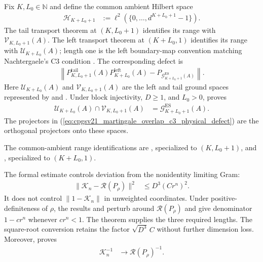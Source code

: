 \documentclass{article}
\providecommand{\Fin}[1]{\{0,\ldots,#1{-}1\}}
\begin{document}
Fix $K,L_0\in\mathbb N$ and define the common ambient Hilbert space
\begin{align}
    \mathcal H_{K+L_0+1}
     & :=
    \ell^2(\Fin{d^{K+L_0+1}}).
    \label{eq:cpgsv21_martingale_overlap_c3_common_ambient}
\end{align}
The tail transport theorem at $(K,L_0+1)$ identifies its range with
$\mathcal V_{K,L_0+1}(A)$. The left transport theorem at $(K+L_0,1)$
identifies its range with $\mathcal U_{K+L_0}(A)$; length one is the left
boundary-map convention matching Nachtergaele's C3 condition
\cite[Equation~(2.4)]{Nachtergaele1996Spectral}. The corresponding defect is
\begin{align}
    \left\lVert
    P^{\mathrm{tail}}_{K,L_0+1}(A)
    P^{\mathrm{left}}_{K+L_0}(A)
    -P_{\mathcal G_{K+L_0+1}^{\mathrm{ES}}(A)}
    \right\rVert.
    \label{eq:cpgsv21_martingale_overlap_c3_physical_defect}
\end{align}
Here $\mathcal U_{K+L_0}(A)$ and $\mathcal V_{K,L_0+1}(A)$ are the left and
tail ground spaces represented by
 and
. Under block injectivity,
$D\geq1$, and $L_0>0$,
 proves
\begin{align}
    \mathcal U_{K+L_0}(A)\cap\mathcal V_{K,L_0+1}(A)
     & =
    \mathcal G_{K+L_0+1}^{\mathrm{ES}}(A).
    \label{eq:cpgsv21_martingale_overlap_c3_ground_space_intersection}
\end{align}
The projectors in
(\ref{eq:cpgsv21_martingale_overlap_c3_physical_defect}) are the orthogonal
projectors onto these spaces.

The common-ambient range identifications are
,
specialized to $(K,L_0+1)$, and
,
specialized to $(K+L_0,1)$.

The formal estimate controls deviation from the nonidentity limiting Gram:
\begin{align}
    \lVert\mathcal K_n-\mathscr R(P_\rho)\rVert^2
     & \leq D^3(Cr^n)^2.
    \label{eq:cpgsv21_martingale_overlap_repeated_gram_control}
\end{align}
It does not control $\lVert1-\mathcal K_n\rVert$ in unweighted coordinates.
Under positive-definiteness of $\rho$, the results
 and
perturb around $\mathscr R(P_\rho)$ and give denominator $1-cr^n$ whenever
$cr^n<1$. The theorem
 supplies the three
required lengths. The square-root conversion retains the factor
$\sqrt{D^3}\,C$ without further dimension loss. Moreover,
 proves
\begin{align}
    \mathcal K_n^{-1}
     & \longrightarrow\mathscr R(P_\rho)^{-1}.
    \label{eq:cpgsv21_martingale_overlap_inverse_gram_convergence}
\end{align}
\end{document}
